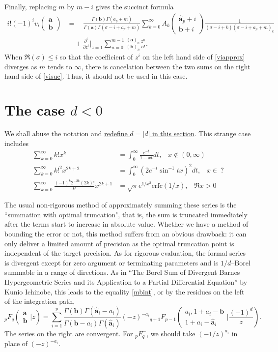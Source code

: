 \documentclass[12pt]{article}
\newcommand{\ee}[0] {e}
\numberwithin{equation}{section}
\newcommand{\FF}[6] {{}_{#1}{#2}_{#3} \left( \begin{array}{c} #4 \\ #5 \end{array} \Big| #6  \right)}
\newcommand{\ARG}[2] {\left( \begin{array}{c} #1 \\ #2 \end{array} \right)}
\begin{document}
Finally, replacing $m$ by $m-i$ gives the succinct formula
\begin{equation}
\label{visuc}
\begin{aligned}
i! (-1)^i v_i \ARG{\mathbf{a}}{\mathbf{b}} &= \quad\frac{\Gamma(\mathbf{b}) \Gamma(a_p+m)}{\Gamma(\mathbf{a}) \Gamma(\sigma-i+a_p+m)} \sum_{k=0}^{\infty} A_k \ARG{\hat{\mathbf{a}}_p+i}{\mathbf{b}+i} \frac{1}{(\sigma-i+k) (\sigma-i+a_p+m)_k}\\
&\quad +\frac{\partial^i}{\partial z^i} \Big|_{z=1} \sum_{n=0}^{m-1}{\frac{(\mathbf{a})_{n}}{(\mathbf{b})_{n}} \frac{z^n}{n!}}\text{.}
\end{aligned}
\end{equation}
When $\Re(\sigma) \le i$ so that the coefficient of $z^i$ on the left hand side of \eqref{viapprox} diverges as $m$ tends to $\infty$, there is cancelation between the two sums on the right hand side of \eqref{visuc}. Thus, it should not be used in this case.

\section{The case $d<0$}
\label{section_negd}
We shall abuse the notation and \underline{redefine $d=|d|$ in this section}. This strange case includes
\begin{align*}
\sum_{k=0}^{\infty} k! x^k &= \int_{0}^{\infty} \frac{\ee^{-t}}{1-x t} dt\text{,} \quad x \not \in (0,\infty)\\
\sum_{k=0}^{\infty} k!^2 x^{2k+2} &= \int_{0}^{\infty} \left(2 \ee^{-t} \sin ^{-1}tx\right)^2 dt\text{,} \quad x \in \ ?\\
\sum_{k=0}^{\infty}\frac{(-1)^k 2^{-2 k} (2 k)!}{k!} x^{2 k+1} &=\sqrt{\pi } \ee^{1/x^2}
   \text{erfc}\left(1/x\right)\text{,} \quad \Re x > 0
\end{align*}

The usual non-rigorous method of approximately summing these series is the ``summation with optimal truncation", that is, the sum is truncated immediately after the terms start to increase in absolute value. Whether we have a method of bounding the error or not, this method suffers from an obvious drawback: it can only deliver a limited amount of precision as the optimal truncation point is independent of the target precision. As for rigorous evaluation, the formal series is divergent except for zero argument or terminating parameters and is $1/d$--Borel summable in a range of directions. As in ``The Borel Sum of Divergent Barnes Hypergeometric Series and its Application to a Partial Differential Equation'' by Kunio Ichinobe, this leads to the equality \eqref{mbint}, or by the residues on the left of the integration path,
\begin{equation}
\label{divrecp}
\FF{p}{F}{q}{\mathbf{a}}{\mathbf{b}}{z} = \sum_{i=1}^{p} \frac{\Gamma(\mathbf{b}) \Gamma(\hat{\mathbf{a}}_i-a_i)}{\Gamma(\mathbf{b}-a_i) \Gamma(\hat{\mathbf{a}}_i)} (-z)^{-a_i} \FF{q+1}{F}{p-1}{a_i,1+a_i-\mathbf{b}}{1+a_i-\hat{\mathbf{a}}_i}{\frac{(-1)^d}{z}}\text{.}
\end{equation}
The series on the right are convergent. For ${}_p^{\,} F_{q}^{-}$, we should take $(-1/z)^{a_i}$ in place of $(-z)^{-a_i}$.
\end{document}
